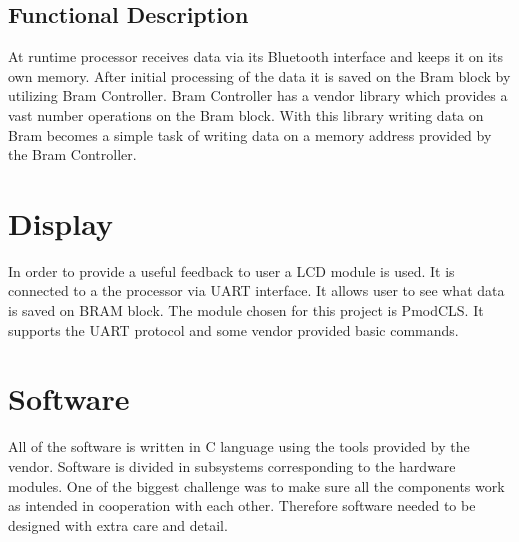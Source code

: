 \subsection{Functional Description}
At runtime processor receives data via its Bluetooth interface and keeps it on its own memory. After initial processing of the data it is saved on the Bram block by utilizing Bram Controller. Bram Controller has a vendor library which provides a vast number operations on the Bram block. With this library writing data on Bram becomes a simple task of writing data on a memory address provided by the Bram Controller.


\section{Display}
In order to provide a useful feedback to user a LCD module is used. It is connected to a the processor via UART interface. It allows user to see what data is saved on BRAM block.
The module chosen for this project is PmodCLS. It supports the UART protocol and some vendor provided basic commands. 

\section{Software}
All of the software is written in C language using the tools provided by the vendor. Software is divided in subsystems corresponding to the hardware modules. 
One of the biggest challenge was to make sure all the components work as intended in cooperation with each other. Therefore software needed to be designed with extra care and detail. 
 
